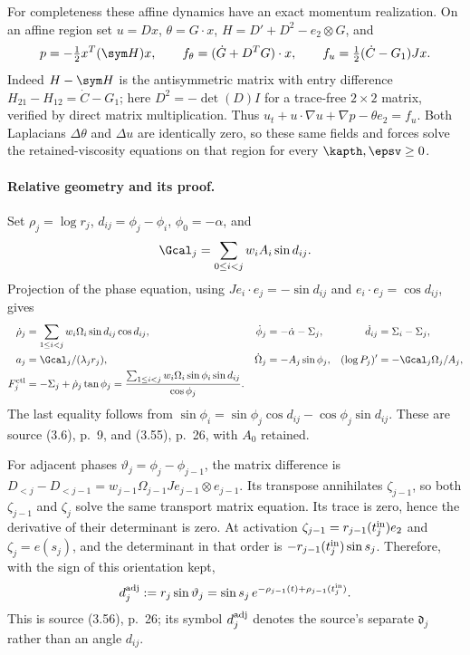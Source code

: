 For completeness these affine dynamics have an exact momentum realization. On an affine region set $u=Dx$, $\theta=G\cdot x$, $H=D'+D^2-e_2\otimes G$, and
\[
 p=-\tfrac12 x^T(\sym H)x,\qquad
 f_\theta=(\dot G+D^TG)\cdot x,\qquad
 f_u=\tfrac12(\dot C-G_1)Jx.
\]
Indeed $H-\sym H$ is the antisymmetric matrix with entry difference $H_{21}-H_{12}=\dot C-G_1$; here $D^2=-\det(D)I$ for a trace-free $2\times2$ matrix, verified by direct matrix multiplication. Thus $u_t+u\cdot\nabla u+\nabla p-\theta e_2=f_u$. Both Laplacians $\Delta\theta$ and $\Delta u$ are identically zero, so these same fields and forces solve the retained-viscosity equations on that region for every $\kapth,\epsv\ge0$.

\paragraph{Relative geometry and its proof.}
Set $\rho_j=\log r_j$, $d_{ij}=\phi_j-\phi_i$, $\phi_0=-\alpha$, and
\[
 \Gcal_j=\sum_{0\le i<j}w_iA_i\sin d_{ij}.
\]
Projection of the phase equation, using $Je_i\cdot e_j=-\sin d_{ij}$ and $e_i\cdot e_j=\cos d_{ij}$, gives
\begin{align}
 \dot\rho_j&=\sum_{1\le i<j}w_i\Omega_i\sin d_{ij}\cos d_{ij},&
 \dot\phi_j&=-\dot\alpha-\Sigma_j,&\dot d_{ij}&=\Sigma_i-\Sigma_j,\label{cvlane:pc:eq:polar}\\
 a_j&=\Gcal_j/(\lambda_jr_j),&\dot\Omega_j&=-A_j\sin\phi_j,&
 (\log P_j)'&=-\Gcal_j\Omega_j/A_j,\nonumber\\
 F_j^{\rm ctl}&=-\Sigma_j+\dot\rho_j\tan\phi_j
 =\frac{\sum_{1\le i<j}w_i\Omega_i\sin\phi_i\sin d_{ij}}{\cos\phi_j}.\nonumber
\end{align}
The last equality follows from $\sin\phi_i=\sin\phi_j\cos d_{ij}-\cos\phi_j\sin d_{ij}$. These are source (3.6), p.~9, and (3.55), p.~26, with $A_0$ retained.

For adjacent phases $\vartheta_j=\phi_j-\phi_{j-1}$, the matrix difference is $D_{<j}-D_{<j-1}=w_{j-1}\Omega_{j-1}Je_{j-1}\otimes e_{j-1}$. Its transpose annihilates $\zeta_{j-1}$, so both $\zeta_{j-1}$ and $\zeta_j$ solve the same transport matrix equation. Its trace is zero, hence the derivative of their determinant is zero. At activation $\zeta_{j-1}=r_{j-1}(t_j^{\rm in})e_2$ and $\zeta_j=e(s_j)$, and the determinant in that order is $-r_{j-1}(t_j^{\rm in})\sin s_j$. Therefore, with the sign of this orientation kept,
\begin{equation}\label{cvlane:pc:eq:determinant}
 d_j^{\rm adj}:=r_j\sin\vartheta_j
 =\sin s_j\,e^{-\rho_{j-1}(t)+\rho_{j-1}(t_j^{\rm in})}.
\end{equation}
This is source (3.56), p.~26; its symbol $d_j^{\rm adj}$ denotes the source's separate $\mathfrak d_j$ rather than an angle $d_{ij}$.


